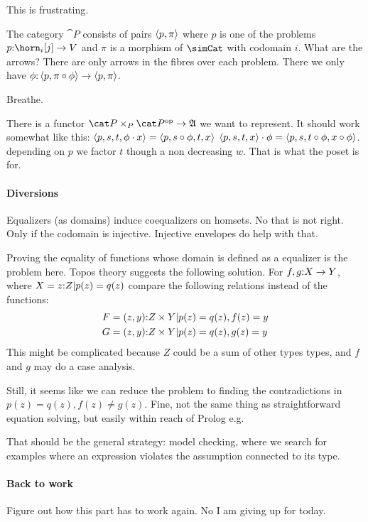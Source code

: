 \documentclass[csh.tex]{subfiles}
\begin{document}
This is frustrating.

The category $\cat P$ consists of pairs $\left\langle p,\pi \right\rangle$ where $p$ is one of the problems $p\of\horn_i[j]\to V$ and $\pi$ is a morphism of $\simCat$ with codomain $i$. What are the arrows? There are only arrows in the fibres over each problem. There we only have $\phi\mathord :\left\langle p,\pi\circ \phi \right\rangle \to \left\langle p,\pi \right\rangle$.

Breathe.

There is a functor $\cat P\times_P \cat P\dual \to \ambient$ we want to represent. It should work somewhat like this: 
$\left\langle p,s,t,\phi\cdot x \right\rangle = \left\langle p, s\circ \phi, t, x \right\rangle$
$\left\langle p,s,t,x \right\rangle\cdot \phi = \left\langle p, s, t\circ \phi, x\circ \phi \right\rangle$.
depending on $p$ we factor $t$ though a non decreasing $w$.
That is what the poset is for.


\paragraph{Diversions}
Equalizers (as domains) induce coequalizers on homsets. No that is not right. Only if the codomain is injective. Injective envelopes do help with that.

Proving the equality of functions whose domain is defined as a equalizer is the problem here. Topos theory suggests the following solution. For $f,g\mathord : X \to Y$, where $X = {z\mathord : Z|p(z)=q(z)}$
compare the following relations instead of the functions:
\begin{align*} 
F &= { (z,y)\mathord : Z\times Y | p(z)=q(z),f(z) = y } \\
G &= { (z,y)\mathord : Z\times Y | p(z)=q(z),g(z) = y } \\
\end{align*}
This might be complicated because $Z$ could be a sum of other types types, and $f$ and $g$ may do a case analysis.

Still, it seems like we can reduce the problem to finding the contradictions in $p(z)=q(z),f(z) \neq g(z)$. Fine, not the same thing as straightforward equation solving, but easily within reach of Prolog e.g.

That should be the general strategy: model checking, where we search for examples where an expression violates the assumption connected to its type.

\paragraph{Back to work}
Figure out how this part has to work again.
No I am giving up for today.
\end{document}
